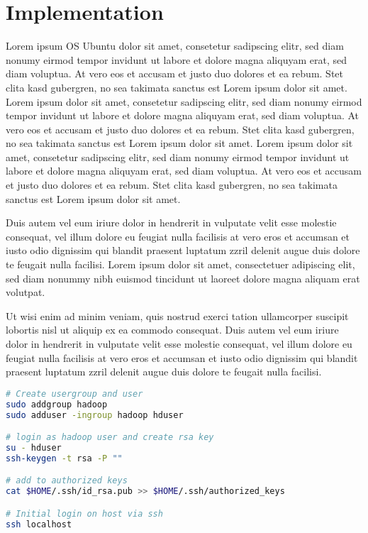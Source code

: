 
\chapter{Implementation}\label{cha:Implementation}









Lorem ipsum \ac{OS} Ubuntu  dolor sit amet, consetetur sadipscing elitr, sed diam nonumy eirmod tempor invidunt ut labore et dolore magna aliquyam erat, sed diam voluptua. At vero eos et accusam et justo duo dolores et ea rebum. Stet clita kasd gubergren, no sea takimata sanctus est Lorem ipsum dolor sit amet. Lorem ipsum dolor sit amet, consetetur sadipscing elitr, sed diam nonumy eirmod tempor invidunt ut labore et dolore magna aliquyam erat, sed diam voluptua. At vero eos et accusam et justo duo dolores et ea rebum. Stet clita kasd gubergren, no sea takimata sanctus est Lorem ipsum dolor sit amet. Lorem ipsum dolor sit amet, consetetur sadipscing elitr, sed diam nonumy eirmod tempor invidunt ut labore et dolore magna aliquyam erat, sed diam voluptua. At vero eos et accusam et justo duo dolores et ea rebum. Stet clita kasd gubergren, no sea takimata sanctus est Lorem ipsum dolor sit amet. 

Duis autem vel eum iriure dolor in hendrerit in vulputate velit esse molestie consequat, vel illum dolore eu feugiat nulla facilisis at vero eros et accumsan et iusto odio dignissim qui blandit praesent luptatum zzril delenit augue duis dolore te feugait nulla facilisi. Lorem ipsum dolor sit amet, consectetuer adipiscing elit, sed diam nonummy nibh euismod tincidunt ut laoreet dolore magna aliquam erat volutpat. 

Ut wisi enim ad minim veniam, quis nostrud exerci tation ullamcorper suscipit lobortis nisl ut aliquip ex ea commodo consequat. Duis autem vel eum iriure dolor in hendrerit in vulputate velit esse molestie consequat, vel illum dolore eu feugiat nulla facilisis at vero eros et accumsan et iusto odio dignissim qui blandit praesent luptatum zzril delenit augue duis dolore te feugait nulla facilisi. 

\newpage
\begin{lstlisting}[language=bash, caption={Konfiguration des Hadoop Users}, label=lis:KonfHadoopUser]
# Create usergroup and user
sudo addgroup hadoop
sudo adduser -ingroup hadoop hduser

# login as hadoop user and create rsa key
su - hduser
ssh-keygen -t rsa -P ""

# add to authorized keys
cat $HOME/.ssh/id_rsa.pub >> $HOME/.ssh/authorized_keys

# Initial login on host via ssh
ssh localhost
\end{lstlisting}

